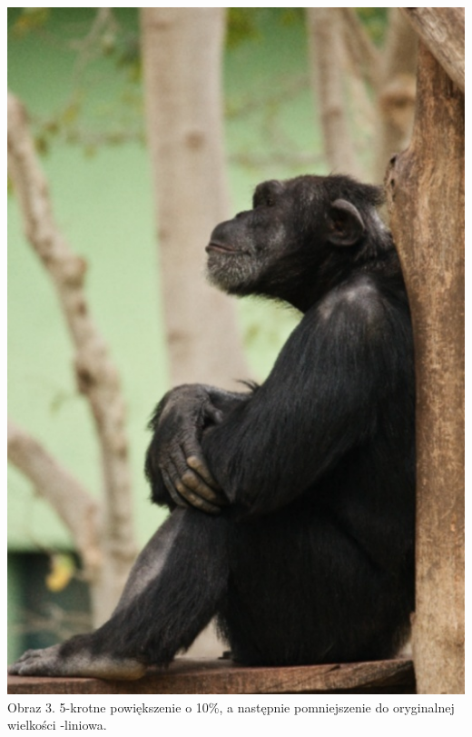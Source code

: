\documentclass[14pt]{article}
\begin{document}
\begin{center}
    \includegraphics[scale=0.3]{images/5x_BACK_TO_ORG_bl.jpg}
    \\ \small Obraz 3. 5-krotne powiększenie o 10\%, a następnie pomniejszenie
    do oryginalnej wielkości -liniowa.


\end{center}
\end{document}
